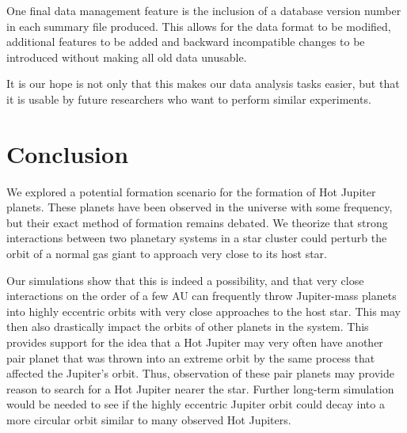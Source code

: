 \documentclass[12pt]{article}
\begin{document}
    One final data management feature is the inclusion of a database version number
    in each summary file produced. This allows for the data format to be modified,
    additional features to be added and backward incompatible changes to be introduced
    without making all old data unusable. 

    It is our hope is not only that this makes our data analysis tasks easier, but
    that it is usable by future researchers who want to perform similar experiments.

\section{Conclusion}

We explored a potential formation scenario for the formation of Hot Jupiter
planets. These planets have been observed in the universe with some frequency,
but their exact method of formation remains debated. 
We theorize that strong interactions between two planetary systems in a star
cluster could perturb the orbit of a normal gas giant to approach very close to
its host star. 

Our simulations show that this is indeed a possibility, and that very close
interactions on the order of a few AU can frequently throw Jupiter-mass planets into
highly eccentric orbits with very close approaches to the host star. 
This may then also drastically impact the orbits of other planets
in the system. This provides support for the idea that a Hot Jupiter may very
often have another pair planet that was thrown into an extreme orbit by the same
process that affected the Jupiter's orbit. Thus,
observation of these pair planets may provide reason to search for a Hot Jupiter
nearer the star.
Further long-term simulation would be needed to see if the highly eccentric Jupiter
orbit could decay into a more circular orbit similar to many observed Hot Jupiters.


\clearpage
\end{document}
